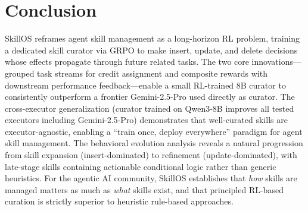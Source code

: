 \documentclass[11pt]{article}
\begin{document}
\section{Conclusion}

SkillOS reframes agent skill management as a long-horizon RL problem, training a dedicated skill curator via GRPO to make insert, update, and delete decisions whose effects propagate through future related tasks. The two core innovations---grouped task streams for credit assignment and composite rewards with downstream performance feedback---enable a small RL-trained 8B curator to consistently outperform a frontier Gemini-2.5-Pro used directly as curator. The cross-executor generalization (curator trained on Qwen3-8B improves all tested executors including Gemini-2.5-Pro) demonstrates that well-curated skills are executor-agnostic, enabling a ``train once, deploy everywhere'' paradigm for agent skill management. The behavioral evolution analysis reveals a natural progression from skill expansion (insert-dominated) to refinement (update-dominated), with late-stage skills containing actionable conditional logic rather than generic heuristics. For the agentic AI community, SkillOS establishes that \emph{how} skills are managed matters as much as \emph{what} skills exist, and that principled RL-based curation is strictly superior to heuristic rule-based approaches.
\end{document}
